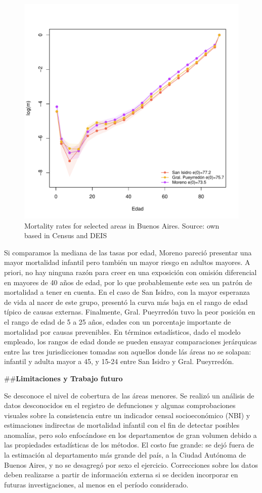 \documentclass[12pt,]{article}
\begin{document}
\begin{figure}

{\centering \includegraphics[width=0.48\linewidth]{plots/SanIsyMoreno} 

}

\caption{Mortality rates for selected areas in Buenos Aires. Source: own based in Census and DEIS}\label{fig:dptosBsAs}
\end{figure}

Si comparamos la mediana de las tasas por edad, Moreno pareció presentar
una mayor mortalidad infantil pero también un mayor riesgo en adultos
mayores. A priori, no hay ninguna razón para creer en una exposición con
omisión diferencial en mayores de 40 años de edad, por lo que
probablemente este sea un patrón de mortalidad a tener en cuenta. En el
caso de San Isidro, con la mayor esperanza de vida al nacer de este
grupo, presentó la curva más baja en el rango de edad típico de causas
externas. Finalmente, Gral. Pueyrredón tuvo la peor posición en el rango
de edad de 5 a 25 años, edades con un porcentaje importante de
mortalidad por causas prevenibles. En términos estadísticos, dado el
modelo empleado, los rangos de edad donde se pueden ensayar
comparaciones jerárquicas entre las tres jurisdicciones tomadas son
aquellos donde lás áreas no se solapan: infantil y adulta mayor a 45, y
15-24 entre San Isidro y Gral. Pueyrredón.

\#\#\textbf{Limitaciones y Trabajo futuro}

Se desconoce el nivel de cobertura de las áreas menores. Se realizó un
análisis de datos desconocidos en el registro de defunciones y algunas
comprobaciones visuales sobre la consistencia entre un indicador censal
socioeconómico (NBI) y estimaciones indirectas de mortalidad infantil
con el fin de detectar posibles anomalías, pero solo enfocándose en los
departamentos de gran volumen debido a las propiedades estadísticas de
los métodos. El costo fue grande: se dejó fuera de la estimación al
departamento más grande del país, a la Ciudad Autónoma de Buenos Aires,
y no se desagregó por sexo el ejercicio. Correcciones sobre los datos
deben realizarse a partir de información externa si se deciden
incorporar en futuras investigaciones, al menos en el período
considerado.
\end{document}
